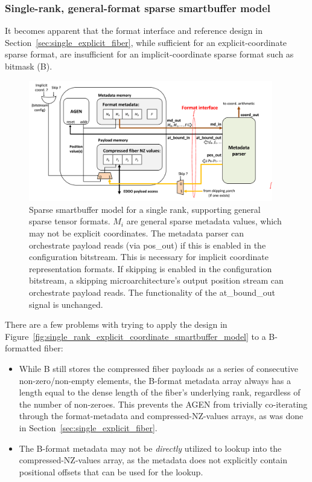 \subsubsection{Single-rank, general-format sparse smartbuffer model}

It becomes apparent that the format interface and reference design in Section~\ref{sec:single_explicit_fiber}, while sufficient for an explicit-coordinate sparse format, are insufficient for an implicit-coordinate sparse format such as bitmask (B)\cite{szebook}.

\begin{figure}[ht]
    \centering
    \includegraphics[width=0.95\textwidth]{figures/single_rank_general_format_smartbuffer_model.png}
    \caption{Sparse smartbuffer model for a single rank, supporting general sparse tensor formats. ${M_i}$ are general sparse metadata values, which may not be explicit coordinates. The metadata parser can orchestrate payload reads (via pos\_out) if this is enabled in the configuration bitstream. This is necessary for implicit coordinate representation formats. If skipping is enabled in the configuration bitstream, a skipping microarchitecture's output position stream can orchestrate payload reads. The functionality of the at\_bound\_out signal is unchanged. }
    \label{fig:single_rank_general_format_smartbuffer_model}
\end{figure}

There are a few problems with trying to apply the design in Figure~\ref{fig:single_rank_explicit_coordinate_smartbuffer_model} to a B-formatted fiber:

\begin{itemize}
    \item While B still stores the compressed fiber payloads as a series of consecutive non-zero/non-empty elements, the B-format metadata array always has a length equal to the dense length of the fiber's underlying rank, regardless of the number of non-zeroes. This prevents the AGEN from trivially co-iterating through the format-metadata and compressed-NZ-values arrays, as was done in Section~\ref{sec:single_explicit_fiber}.
    \item The B-format metadata may not be \textit{directly} utilized to lookup into the compressed-NZ-values array, as the metadata does not explicitly contain positional offsets that can be used for the lookup. 
\end{itemize}

